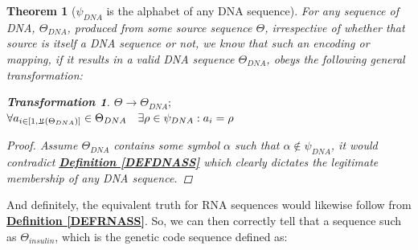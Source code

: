 \documentclass[a4paper, 18pt]{book} %
\newtheorem{theo}{Theorem}
\newtheorem{trans}{Transformation}
\newcommand{\invpi}{\rotatebox[origin=c]{180}{$\pi$}}
\begin{document}
\begin{theo}[$\psi_{DNA}$ is the alphabet of any DNA sequence]
\label{THEODNA}
For any sequence of DNA, $\Theta_{DNA}$, produced from some source sequence $\Theta$, irrespective of whether that source is itself a DNA sequence or not, we know that such an encoding or mapping, if it results in a valid DNA sequence $\Theta_{DNA}$, obeys the following general transformation:\\

\begin{trans}
\label{TRANSmDNA}
$\Theta \rightarrow \Theta_{DNA};$\\
$\forall a_{i \in [1,\invpi(\Theta_{DNA})]} \in \Theta_{DNA} \quad \exists \rho \in \psi_{DNA}: a_i = \rho$
\end{trans}

\begin{proof}
    Assume $\Theta_{DNA}$ contains some symbol $\alpha$ such that $\alpha \not\in \psi_{DNA}$, it would contradict \textbf{\hyperref[DEFDNASS]{Definition \ref{DEFDNASS}}} which clearly dictates the legitimate membership of any DNA sequence.
\end{proof}

\end{theo}


And definitely, the equivalent truth for RNA sequences would likewise follow from \textbf{\hyperref[DEFRNASS]{Definition \ref{DEFRNASS}}}. So, we can then correctly tell that a sequence such as $\Theta_{insulin}$, which is the genetic code sequence defined as:\\


\\
\end{document}
